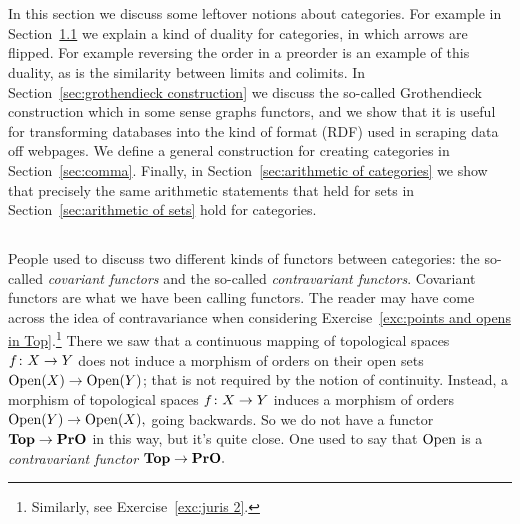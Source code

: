\documentclass[CT4S-EN-RU]{subfiles}
\begin{document}
\section{}

\begin{blockENG}
In this section we discuss some leftover notions about categories. For example in Section~\ref{sec:opposite} we explain a kind of duality for categories, in which arrows are flipped. For example reversing the order in a preorder is an example of this duality, as is the similarity between limits and colimits. In Section~\ref{sec:grothendieck construction} we discuss the so-called Grothendieck construction which in some sense graphs functors, and we show that it is useful for transforming databases into the kind of format (RDF) used in scraping data off webpages. We define a general construction for creating categories in Section~\ref{sec:comma}. Finally, in Section~\ref{sec:arithmetic of categories} we show that precisely the same arithmetic statements that held for sets in Section~\ref{sec:arithmetic of sets} hold for categories. 
\end{blockENG}

\begin{blockRUS}
\end{blockRUS}


\subsection{}\label{sec:opposite}

\begin{blockENG}
People used to discuss two different kinds of functors between categories: the so-called {\em covariant functors} and the so-called {\em contravariant functors}. Covariant functors are what we have been calling functors. The reader may have come across the idea of contravariance when considering Exercise~\ref{exc:points and opens in Top}.\footnote{Similarly, see Exercise~\ref{exc:juris 2}.} There we saw that a continuous mapping of topological spaces $f\colon X\rightarrow Y$ does not induce a morphism of orders on their open sets $\textnormal{Open}(X)\rightarrow\textnormal{Open}(Y)$; that is not required by the notion of continuity. Instead, a morphism of topological spaces $f\colon X\rightarrow Y$ induces a morphism of orders $\textnormal{Open}(Y)\rightarrow\textnormal{Open}(X),$ going backwards. So we do not have a functor ${\mathbf{Top}}\rightarrow{\mathbf{PrO}}$ in this way, but it's quite close. One used to say that $\textnormal{Open}$ is a {\em contravariant functor} ${\mathbf{Top}}\rightarrow{\mathbf{PrO}}.$
\end{blockENG}
\end{document}
